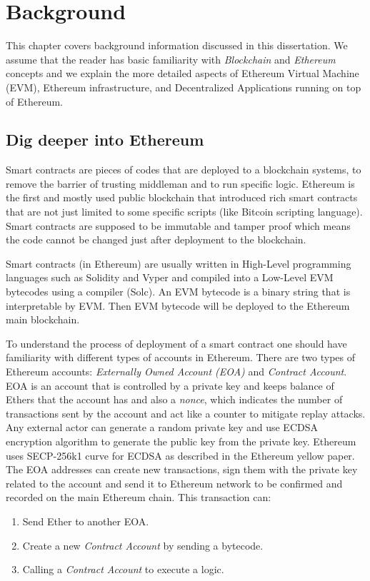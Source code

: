 \chapter{Background}
\label{chap:background}
This chapter covers background information discussed in this dissertation. We assume that the reader has basic familiarity with \textit{Blockchain} and \textit{Ethereum} concepts and we explain the more detailed aspects of Ethereum Virtual Machine (EVM), Ethereum infrastructure, and Decentralized Applications running on top of Ethereum. 


\section{Dig deeper into Ethereum}
Smart contracts are pieces of codes that are deployed to a blockchain systems, to remove the barrier of trusting middleman and to run specific logic. Ethereum is the first and mostly used public blockchain that introduced rich smart contracts that are not just limited to some specific scripts (like Bitcoin scripting language). Smart contracts are supposed to be immutable and tamper proof which means the code cannot be changed just after deployment to the blockchain.

Smart contracts (in Ethereum) are usually written in High-Level programming languages such as Solidity and Vyper and compiled into a Low-Level EVM bytecodes using a compiler (\eg Solc). An EVM bytecode is a binary string that is interpretable by EVM. Then EVM bytecode will be deployed to the Ethereum main blockchain.

To understand the process of deployment of a smart contract one should have familiarity with different types of accounts in Ethereum. There are two types of Ethereum accounts: \textit{Externally Owned Account (EOA)} and \textit{Contract Account}. 
EOA is an account that is controlled by a private key and keeps balance of Ethers that the account has and also a \textit{nonce}, which indicates the number of transactions sent by the account and act like a counter to mitigate replay attacks. Any external actor can generate a random private key and use ECDSA encryption algorithm to generate the public key from the private key. Ethereum uses SECP-256k1 curve for ECDSA as described in the Ethereum yellow paper.
The EOA addresses can create new transactions, sign them with the private key related to the account and send it to Ethereum network to be confirmed and recorded on the main Ethereum chain. This transaction can:
\begin{enumerate}
    \item Send Ether to another EOA.
    \item Create a new \textit{Contract Account} by sending a bytecode.
    \item Calling a \textit{Contract Account} to execute a logic.
\end{enumerate}

